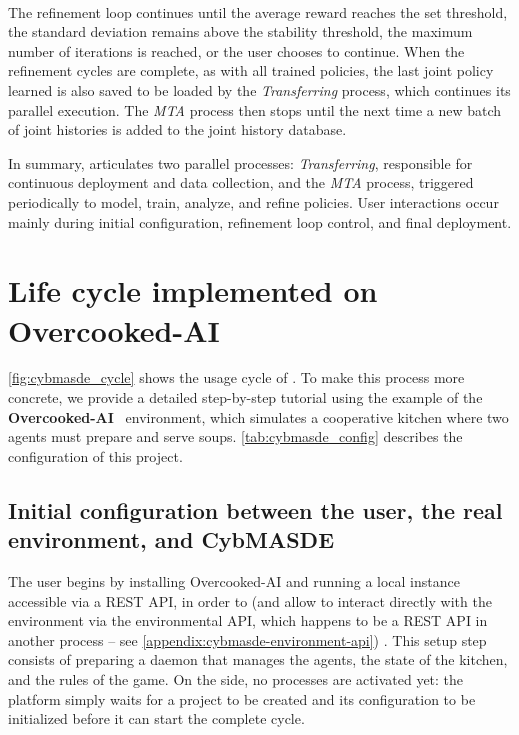 \

The refinement loop continues until the average reward reaches the set threshold, the standard deviation remains above the stability threshold, the maximum number of iterations is reached, or the user chooses to continue. When the refinement cycles are complete, as with all trained policies, the last joint policy learned is also saved to be loaded by the \textit{Transferring} process, which continues its parallel execution. The \textit{MTA} process then stops until the next time a new batch of joint histories is added to the joint history database.


\medskip
In summary,  articulates two parallel processes: \textit{Transferring}, responsible for continuous deployment and data collection, and the \textit{MTA} process, triggered periodically to model, train, analyze, and refine policies.
User interactions occur mainly during initial configuration, refinement loop control, and final deployment.

\section{Life cycle implemented on Overcooked-AI}

\autoref{fig:cybmasde_cycle} shows the usage cycle of .
To make this process more concrete, we provide a detailed step-by-step tutorial using the example of the \textbf{Overcooked-AI}~\cite{overcookedai} environment, which simulates a cooperative kitchen where two agents must prepare and serve soups. \autoref {tab:cybmasde_config} describes the configuration of this project.

\subsection{Initial configuration between the user, the real environment, and CybMASDE}

The user begins by installing Overcooked-AI and running a local instance accessible via a REST API, in order to  (and allow  to interact directly with the environment via the environmental API, which happens to be a REST API in another process -- see \autoref{appendix:cybmasde-environment-api}) . This setup step consists of preparing a daemon that manages the agents, the state of the kitchen, and the rules of the game. On the  side, no processes are activated yet: the platform simply waits for a project to be created and its configuration to be initialized before it can start the complete cycle.

